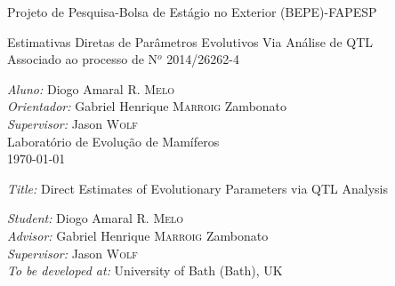 \documentclass[twoside,a4paper,12pt]{article}
\begin{document}
\pagestyle{empty}
\begin{titlepage}

\begin{center}
\large{Projeto de Pesquisa-Bolsa de Estágio no Exterior (BEPE)-FAPESP}\\

\vspace*{\fill}

\LARGE{Estimativas Diretas de Parâmetros Evolutivos Via Análise de QTL}\\

\vspace{20pt}
\small{Associado ao processo de N$^{o}$ 2014/26262-4}
\vspace{2cm}


\vspace*{\fill}

\small{\emph{Aluno:} Diogo Amaral R. \textsc{Melo}\\
\emph{Orientador:} Gabriel Henrique \textsc{Marroig}} Zambonato\\
\emph{Supervisor:} Jason \textsc{Wolf}\\
\vspace{10pt}
\large{Laboratório de Evolução de Mamíferos}
\\
\vspace{10pt}
\large{\today}

\end{center}

\thispagestyle{empty}
\end{titlepage}



\noindent
\large{\emph{Title:} Direct Estimates of Evolutionary Parameters via QTL Analysis}\\
\begin{normalsize}
\noindent
\emph{Student:} Diogo Amaral R. \textsc{Melo}\\
\emph{Advisor:} Gabriel Henrique \textsc{Marroig} Zambonato\\
\emph{Supervisor:} Jason \textsc{Wolf}\\
\emph{To be developed at:} University of Bath (Bath), UK\\
\end{normalsize}
\end{document}
